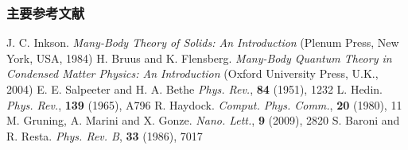 \documentclass[cjk,slidestop,compress,mathserif,blue]{beamer}
\begin{document}

\begin{thebibliography}{99}
\frame
{
\frametitle{主要参考文献}
{\small
        \textrm{J. C. Inkson. \textit{Many-Body Theory of Solids: An Introduction} (Plenum Press, New York, USA, 1984)}
	\textrm{H. Bruus and K. Flensberg. \textit{Many-Body Quantum Theory in Condensed Matter Physics: An Introduction} (Oxford University Press, U.K., 2004)}
	\textrm{E. E. Salpeeter and H. A. Bethe \textit{Phys. Rev.}, \textbf{84} (1951), 1232}
	\textrm{L. Hedin. \textit{Phys. Rev.}, \textbf{139} (1965), A796}
	\fontsize{9.6pt}{3.9pt}
	\textrm{R. Haydock. \textit{Comput. Phys. Comm.}, \textbf{20} (1980), 11}
	\textrm{M. Gruning, A. Marini and X. Gonze. \textit{Nano. Lett.}, \textbf{9} (2009), 2820}
	\textrm{S. Baroni and R. Resta. \textit{Phys. Rev. B}, \textbf{33} (1986), 7017}
}
\nocite*{}
}
\end{thebibliography}
\end{document}

